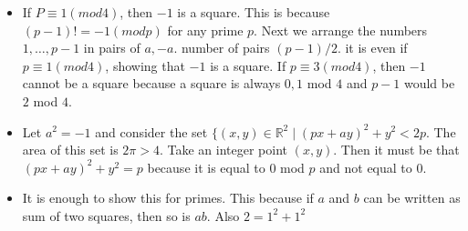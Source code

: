 \documentclass[12pt]{article}
\begin{document}
\begin{itemize}
\item If $P \equiv 1 (mod 4)$, then 
$-1$ is a square. This is because 
$(p-1)!=-1 (mod p)$ for any prime $p$.
Next we arrange the numbers $1, \ldots, p-1$
in pairs of $a, -a$. number of pairs
$(p-1)/2$. it is even if $p \equiv 1 (mod 4)$,
showing that $-1$ is a square.
If $p \equiv 3 (mod 4)$, then $-1$ cannot be a square because a square is always $0,1$ mod $4$
and $p-1$ would be $2$ mod $4$.

\item Let $a^2=-1$ and consider the set 
$\{(x,y) \in \mathbb{R}^2 \mid 
(px+ay)^2+y^2<2p$.
The area of this set is $2\pi>4$.
Take an integer point $(x,y)$. 
Then it must be that $(px+ay)^2+y^2=p$ because
it is equal to $0$ mod $p$ and not equal to $0$.

\item It is enough to show this for primes.
This because if $a$ and $b$ can be written as sum of two squares, then so is $ab$.
Also $2=1^2+1^2$





\end{itemize}
\end{document}

